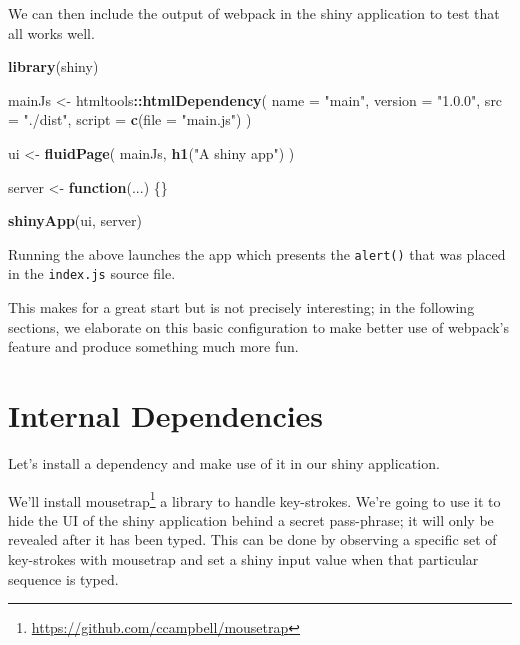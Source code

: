 \documentclass[
  10pt,
]{krantz}
\makeatletter
\newenvironment{Shaded}{\begin{snugshade}}{\end{snugshade}}
\newcommand{\ControlFlowTok}[1]{\textcolor[rgb]{0.27,0.27,0.27}{\textbf{#1}}}
\newcommand{\DataTypeTok}[1]{\textcolor[rgb]{0.27,0.27,0.27}{#1}}
\newcommand{\KeywordTok}[1]{\textcolor[rgb]{0.27,0.27,0.27}{\textbf{#1}}}
\newcommand{\NormalTok}[1]{#1}
\newcommand{\OperatorTok}[1]{\textcolor[rgb]{0.43,0.43,0.43}{\textbf{#1}}}
\newcommand{\StringTok}[1]{\textcolor[rgb]{0.5,0.5,0.5}{#1}}
\renewcommand{\href}[2]{#2\footnote{\url{#1}}}
\newenvironment{kframe}{%
\medskip{}
\setlength{\fboxsep}{.8em}
 \def\at@end@of@kframe{}%
 \ifinner\ifhmode%
  \def\at@end@of@kframe{\end{minipage}}%
  \begin{minipage}{\columnwidth}%
 \fi\fi%
 \def\FrameCommand##1{\hskip\@totalleftmargin \hskip-\fboxsep
 \colorbox{shadecolor}{##1}\hskip-\fboxsep
     \hskip-\linewidth \hskip-\@totalleftmargin \hskip\columnwidth}%
 \MakeFramed {\advance\hsize-\width
   \@totalleftmargin\z@ \linewidth\hsize
   \@setminipage}}%
 {\par\unskip\endMakeFramed%
 \at@end@of@kframe}
\renewenvironment{Shaded}{\begin{kframe}}{\end{kframe}}
\makeatother
\begin{document}
We can then include the output of webpack in the shiny application to test that all works well.

\begin{Shaded}
\begin{Highlighting}[]
\KeywordTok{library}\NormalTok{(shiny)}

\NormalTok{mainJs <{-}}\StringTok{ }\NormalTok{htmltools}\OperatorTok{::}\KeywordTok{htmlDependency}\NormalTok{(}
  \DataTypeTok{name =} \StringTok{"main"}\NormalTok{,}
  \DataTypeTok{version =} \StringTok{"1.0.0"}\NormalTok{,}
  \DataTypeTok{src =} \StringTok{"./dist"}\NormalTok{,}
  \DataTypeTok{script =} \KeywordTok{c}\NormalTok{(}\DataTypeTok{file =} \StringTok{"main.js"}\NormalTok{)}
\NormalTok{)}

\NormalTok{ui <{-}}\StringTok{ }\KeywordTok{fluidPage}\NormalTok{(}
\NormalTok{  mainJs,}
  \KeywordTok{h1}\NormalTok{(}\StringTok{"A shiny app"}\NormalTok{)}
\NormalTok{)}

\NormalTok{server <{-}}\StringTok{ }\ControlFlowTok{function}\NormalTok{(...) \{\}}

\KeywordTok{shinyApp}\NormalTok{(ui, server)}
\end{Highlighting}
\end{Shaded}

Running the above launches the app which presents the \texttt{alert()} that was placed in the \texttt{index.js} source file.

This makes for a great start but is not precisely interesting; in the following sections, we elaborate on this basic configuration to make better use of webpack's feature and produce something much more fun.

\hypertarget{webpack-intro-internal-dependencies}{%
\section{Internal Dependencies}\label{webpack-intro-internal-dependencies}}

Let's install a dependency and make use of it in our shiny application.

We'll install \href{https://github.com/ccampbell/mousetrap}{mousetrap} a library to handle key-strokes. We're going to use it to hide the UI of the shiny application behind a secret pass-phrase; it will only be revealed after it has been typed. This can be done by observing a specific set of key-strokes with mousetrap and set a shiny input value when that particular sequence is typed.
\end{document}
